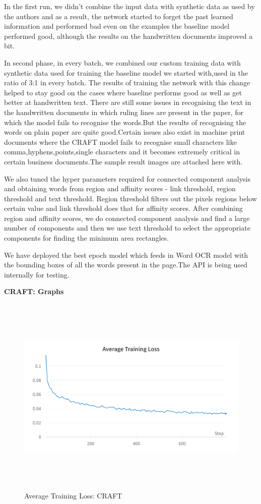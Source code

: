 In the first run, we didn't combine the input data with synthetic data as used by the authors and as a result, the network started to forget the past learned information and performed bad even on the examples the baseline model performed good, although the results on the handwritten documents improved a bit.

In second phase, in every batch, we combined our custom training data with synthetic data used for training the baseline model we started with,used in the ratio of 3:1 in every batch. The results of training the network with this change helped to stay good on the cases where baseline performs good as well as get better at handwritten text. There are still some issues in recognising the text in the handwritten documents in which ruling lines are present in the paper, for which the model fails to recognise the words.But the results of recognising the words on plain paper are quite good.Certain issues also exist in machine print documents where the CRAFT model fails to recognise small characters like comma,hyphens,points,single characters and it becomes extremely critical in certain business documents.The sample result images are attached here with. 

We also tuned the hyper parameters required for connected component analysis and obtaining words from region and affinity scores - link threshold, region threshold and text threshold. Region threshold filters out the pixels regions below certain value and link threshold does that for affinity scores. After combining region and affinity scores, we do connected component analysis and find a large number of components and then we use text threshold to select the appropriate components for finding the minimum area rectangles.

We have deployed the best epoch model which feeds in Word OCR model with the bounding boxes of all the words present in the page.The API is being used internally for testing. 

{\Large  \textbf{CRAFT: Graphs}}

\begin{figure}[H]
	\includegraphics[width=475pt,height=275pt]{Training Loss CRAFT.png}
	\caption{Average Training Loss: CRAFT}
\end{figure}

